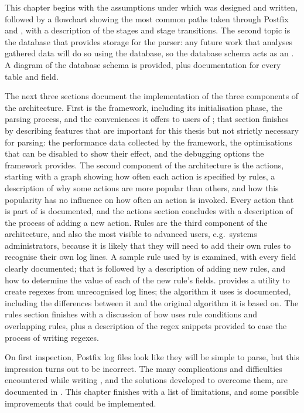 This chapter begins with the assumptions under which \parsername{} was
designed and written, followed by a flowchart showing the most common paths
taken through Postfix and \parsername{}, with a description of the stages
and stage transitions.  The second topic is the  database that
provides storage for the parser: any future work that analyses gathered
data will do so using the database, so the database schema acts as an
.  A diagram of the database schema is provided, plus
documentation for every table and field.

The next three sections document the implementation of the three components
of the architecture.  First is the framework, including its initialisation
phase, the parsing process, and the conveniences it offers to users of
\parsername{}; that section finishes by describing features that are
important for this thesis but not strictly necessary for parsing: the
performance data collected by the framework, the optimisations that can be
disabled to show their effect, and the debugging options the framework
provides.  The second component of the architecture is the actions,
starting with a graph showing how often each action is specified by rules,
a description of why some actions are more popular than others, and how
this popularity has no influence on how often an action is invoked.  Every
action that is part of \parsername{} is documented, and the actions section
concludes with a description of the process of adding a new action.  Rules
are the third component of the architecture, and also the most visible to
advanced users, e.g.\ systems administrators, because it is likely that
they will need to add their own rules to recognise their own log lines.  A
sample rule used by \parsername{} is examined, with every field clearly
documented; that is followed by a description of adding new rules, and how
to determine the value of each of the new rule's fields.  \parsername{}
provides a utility to create regexes from unrecognised log lines; the
algorithm it uses is documented, including the differences between it and
the original algorithm it is based on.  The rules section finishes with a
discussion of how \parsername{} uses rule conditions and overlapping rules,
plus a description of the regex snippets provided to ease the process of
writing regexes.

On first inspection, Postfix log files look like they will be simple to
parse, but this impression turns out to be incorrect.  The many
complications and difficulties encountered while writing \parsername{}, and
the solutions developed to overcome them, are documented in
.  This chapter finishes with a list of
\parsernames{} limitations, and some possible improvements that could be
implemented.

